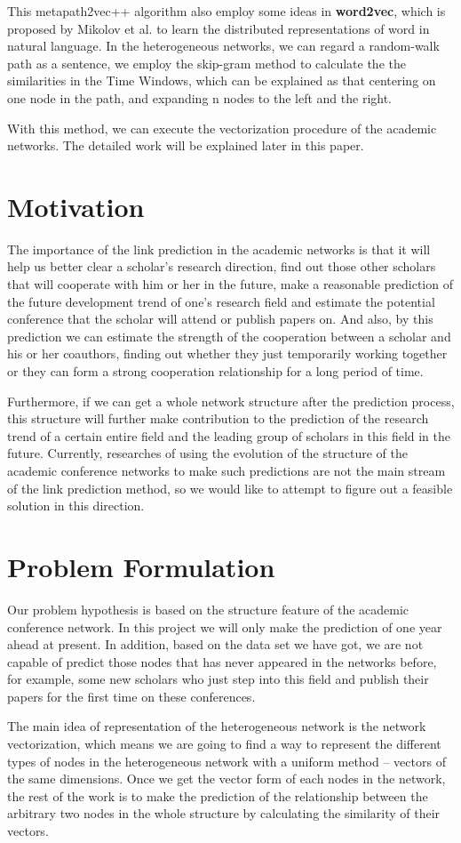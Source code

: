 \documentclass{acmtog} %
\begin{document}
\par This metapath2vec++ algorithm also employ some ideas in \textbf{word2vec}, which is proposed by Mikolov et al. to learn the distributed representations of word in natural language\cite{wv}. In the heterogeneous networks, we can regard a random-walk path as a sentence, we employ the skip-gram method to calculate the the similarities in the Time Windows, which can be explained as that centering on one node in the path, and expanding n nodes to the left and the right.
\par With this method, we can execute the vectorization procedure of the academic networks. The detailed work will be explained later in this paper.

\section{Motivation}
The importance of the link prediction in the academic networks is that it will help us better clear a scholar's research direction, find out those other scholars that will cooperate with him or her in the future, make a reasonable prediction of the future development trend of one's research field and estimate the potential conference that the scholar will attend or publish papers on. And also, by this prediction we can estimate the strength of the cooperation between a scholar and his or her coauthors, finding out whether they just temporarily working together or they can form a strong cooperation relationship for a long period of time.
\par Furthermore, if we can get a whole network structure after the prediction process, this structure will further make contribution to the prediction of the research trend of a certain entire field and the leading group of scholars in this field in the future. Currently, researches of using the evolution of the structure of the academic conference networks to make such predictions are not the main stream of the link prediction method, so we would like to attempt to figure out a feasible solution in this direction.

\section{Problem Formulation}
Our problem hypothesis is based on the structure feature of the academic conference network. In this project we will only make the prediction of one year ahead at present. In addition, based on the data set we have got, we are not capable of predict those nodes that has never appeared in the networks before, for example, some new scholars who just step into this field and publish their papers for the first time on these conferences.
\par The main idea of representation of the heterogeneous network is the network vectorization, which means we are going to find a way to represent the different types of nodes in the heterogeneous network with a uniform method -- vectors of the same dimensions. Once we get the vector form of each nodes in the network, the rest of the work is to make the prediction of the relationship between the arbitrary two nodes in the whole structure by calculating the similarity of their vectors.
\end{document}
